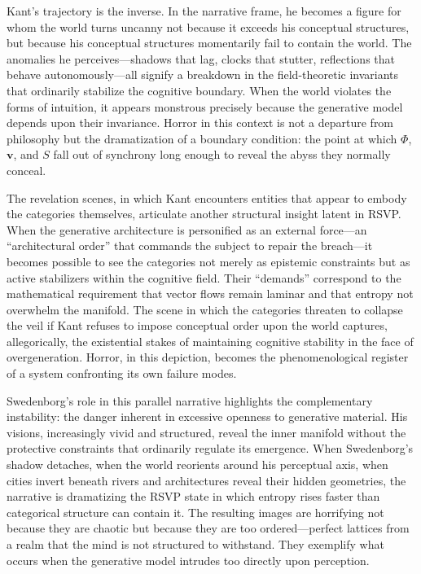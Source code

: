 \documentclass[12pt]{article}
\begin{document}
Kant’s trajectory is the inverse. In the narrative frame, he becomes a figure 
for whom the world turns uncanny not because it exceeds his conceptual 
structures, but because his conceptual structures momentarily fail to contain 
the world. The anomalies he perceives—shadows that lag, clocks that stutter, 
reflections that behave autonomously—all signify a breakdown in the 
field-theoretic invariants that ordinarily stabilize the cognitive boundary. 
When the world violates the forms of intuition, it appears monstrous precisely 
because the generative model depends upon their invariance. Horror in this 
context is not a departure from philosophy but the dramatization of a boundary 
condition: the point at which $\Phi$, $\mathbf{v}$, and $S$ fall out of 
synchrony long enough to reveal the abyss they normally conceal.

The revelation scenes, in which Kant encounters entities that appear to embody 
the categories themselves, articulate another structural insight latent in RSVP. 
When the generative architecture is personified as an external force—an 
“architectural order” that commands the subject to repair the breach—it becomes 
possible to see the categories not merely as epistemic constraints but as 
active stabilizers within the cognitive field. Their “demands” correspond to the 
mathematical requirement that vector flows remain laminar and that entropy not 
overwhelm the manifold. The scene in which the categories threaten to collapse 
the veil if Kant refuses to impose conceptual order upon the world captures, 
allegorically, the existential stakes of maintaining cognitive stability in the 
face of overgeneration. Horror, in this depiction, becomes the phenomenological 
register of a system confronting its own failure modes.

Swedenborg’s role in this parallel narrative highlights the complementary 
instability: the danger inherent in excessive openness to generative material.  
His visions, increasingly vivid and structured, reveal the inner manifold 
without the protective constraints that ordinarily regulate its emergence.  
When Swedenborg’s shadow detaches, when the world reorients around his 
perceptual axis, when cities invert beneath rivers and architectures reveal 
their hidden geometries, the narrative is dramatizing the RSVP state in which 
entropy rises faster than categorical structure can contain it. The resulting 
images are horrifying not because they are chaotic but because they are too 
ordered—perfect lattices from a realm that the mind is not structured to 
withstand. They exemplify what occurs when the generative model intrudes too 
directly upon perception.
\end{document}
